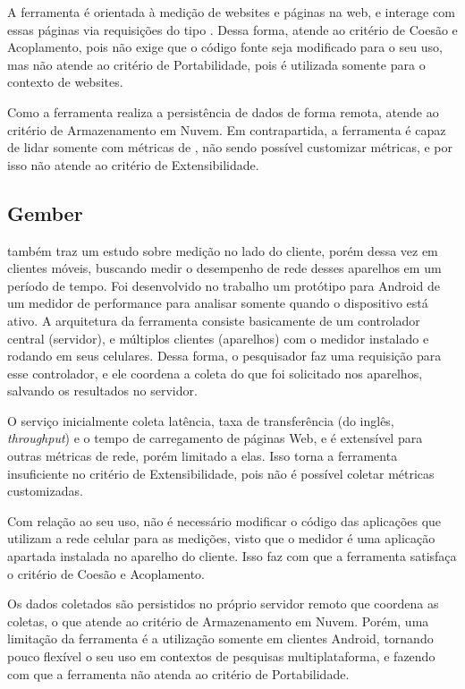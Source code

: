 \documentclass[12pt]{tcc}
\begin{document}
	A ferramenta é orientada à medição de websites e páginas na web, e interage com essas páginas via requisições do tipo . Dessa forma, atende ao critério de Coesão e Acoplamento, pois não exige que o código fonte seja modificado para o seu uso, mas não atende ao critério de Portabilidade, pois é utilizada somente para o contexto de websites.

	Como a ferramenta realiza a persistência de dados de forma remota, atende ao critério de Armazenamento em Nuvem. Em contrapartida, a ferramenta é capaz de lidar somente com métricas de , não sendo possível customizar métricas, e por isso não atende ao critério de Extensibilidade.

	\subsection{Gember}
	\par \citet{Gember2012Obtaining} também traz um estudo sobre medição no lado do cliente, porém dessa vez em clientes móveis, buscando medir o desempenho de rede desses aparelhos em um período de tempo. Foi desenvolvido no trabalho um protótipo para Android de um medidor de performance para analisar somente quando o dispositivo está ativo. A arquitetura da ferramenta consiste basicamente de um controlador central (servidor), e múltiplos clientes (aparelhos) com o medidor instalado e rodando em seus celulares. Dessa forma, o pesquisador faz uma requisição para esse controlador, e ele coordena a coleta do que foi solicitado nos aparelhos, salvando os resultados no servidor.

	O serviço inicialmente coleta latência, taxa de transferência (do inglês, \emph{throughput}) e o tempo de carregamento de páginas Web, e é extensível para outras métricas de rede, porém limitado a elas. Isso torna a ferramenta insuficiente no critério de Extensibilidade, pois não é possível coletar métricas customizadas. 

	Com relação ao seu uso, não é necessário modificar o código das aplicações que utilizam a rede celular para as medições, visto que o medidor é uma aplicação apartada instalada no aparelho do cliente. Isso faz com que a ferramenta satisfaça o critério de Coesão e Acoplamento. 

	Os dados coletados são persistidos no próprio servidor remoto que coordena as coletas, o que atende ao critério de Armazenamento em Nuvem. Porém, uma limitação da ferramenta é a utilização somente em clientes Android, tornando pouco flexível o seu uso em contextos de pesquisas multiplataforma, e fazendo com que a ferramenta não atenda ao critério de Portabilidade.
\end{document}
